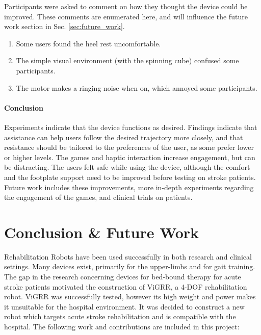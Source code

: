 \documentclass[12pt]{report}
\begin{document}
Participants were asked to comment on how they thought the device could be improved. These comments are enumerated here, and will influence the future work section in Sec. \ref{sec:future_work}. 		
		
		\begin{enumerate}
			\item Some users found the heel rest uncomfortable. 
			\item The simple visual environment (with the spinning cube) confused some participants.
			\item The motor makes a ringing noise when on, which annoyed some participants.
		
		
		\end{enumerate}
		
\subsubsection{Conclusion}

 Experiments indicate that the device functions as desired. Findings indicate that assistance can help users follow the desired trajectory more closely, and that resistance should be tailored to the preferences of the user, as some prefer lower or higher levels. The games and haptic interaction increase engagement, but can be distracting. The users felt safe while using the device, although the comfort and the footplate support need to be improved before testing on stroke patients. Future work includes these improvements, more in-depth experiments regarding the engagement of the games, and clinical trials on patients. 
	

\afterpage{\null\newpage}
\chapter{Conclusion \& Future Work} \label{ch_conc}

	Rehabilitation Robots have been used successfully in both research and clinical settings. Many devices exist, primarily for the upper-limbs and for gait training. The gap in the research concerning devices for bed-bound therapy for acute stroke patients motivated the construction of ViGRR, a 4-DOF rehabilitation robot. ViGRR was successfully tested, however its high weight and power makes it unsuitable for the hospital environment. It was decided to construct a new robot which targets acute stroke rehabilitation and is compatible with the hospital. The following work and contributions are included in this project: 
	
\end{document}
